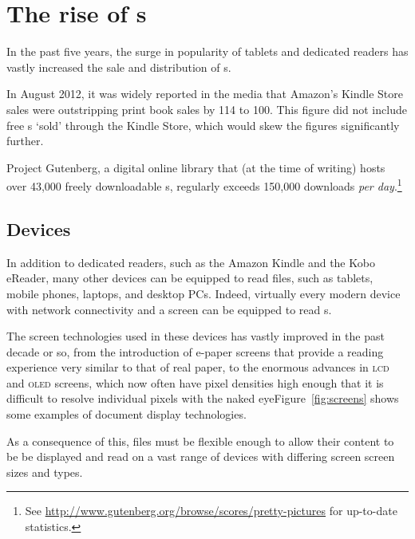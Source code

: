 \cleardoublepage
\chapter{The rise of \ebook{}s} \label{ch:intro}

In the past five years, the surge in popularity of tablets and dedicated \ebook{} readers has vastly increased the sale and distribution of \ebook{}s.

In August 2012, it was widely reported in the media that Amazon's Kindle Store sales were outstripping print book sales by 114 to 100. This figure did not include free \ebook{}s `sold' through the Kindle Store, which would skew the figures significantly further.

Project Gutenberg, a digital online library that (at the time of writing) hosts over 43,000 freely downloadable \ebook{}s, regularly exceeds 150,000 downloads \emph{per day}.\footnote{See \url{http://www.gutenberg.org/browse/scores/pretty-pictures} for up-to-date statistics.}

\section{Devices}

In addition to dedicated \ebook{} readers, such as the Amazon Kindle and the Kobo eReader, many other devices  can be equipped to read \ebook{} files, such as tablets, mobile phones, laptops, and desktop PCs. Indeed, virtually every modern device with network connectivity and a screen can be equipped to read \ebook{}s.

The screen technologies used in these devices has vastly improved in the past decade or so, from the introduction of e-paper screens that provide a reading experience very similar to that of real paper, to the enormous advances in \textsc{lcd} and \textsc{oled} screens, which now often have pixel densities high enough that it is difficult to resolve individual pixels with the naked eye\ed Figure~\ref{fig:screens} shows some examples of document display technologies.

As a consequence of this, \ebook{} files must be flexible enough to allow their content to be be displayed and read on a vast range of devices with differing screen screen sizes and types.

